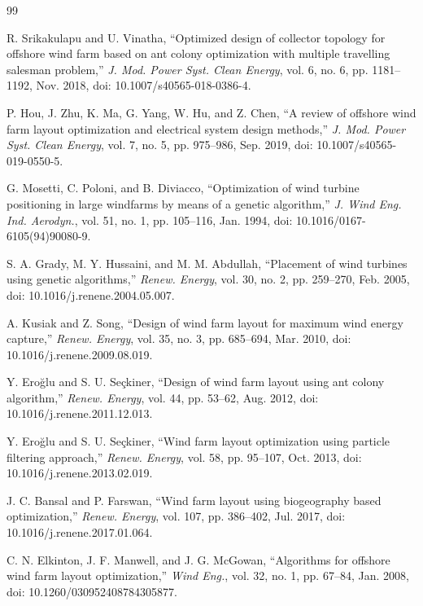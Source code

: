 \begin{thebibliography}{99}

R. Srikakulapu and U. Vinatha, ``Optimized design of collector topology for offshore wind farm based on ant colony optimization with multiple travelling salesman problem,'' \textit{J. Mod. Power Syst. Clean Energy}, vol. 6, no. 6, pp. 1181--1192, Nov. 2018, doi: 10.1007/s40565-018-0386-4.

P. Hou, J. Zhu, K. Ma, G. Yang, W. Hu, and Z. Chen, ``A review of offshore wind farm layout optimization and electrical system design methods,'' \textit{J. Mod. Power Syst. Clean Energy}, vol. 7, no. 5, pp. 975--986, Sep. 2019, doi: 10.1007/s40565-019-0550-5.

G. Mosetti, C. Poloni, and B. Diviacco, ``Optimization of wind turbine positioning in large windfarms by means of a genetic algorithm,'' \textit{J. Wind Eng. Ind. Aerodyn.}, vol. 51, no. 1, pp. 105--116, Jan. 1994, doi: 10.1016/0167-6105(94)90080-9.

S. A. Grady, M. Y. Hussaini, and M. M. Abdullah, ``Placement of wind turbines using genetic algorithms,'' \textit{Renew. Energy}, vol. 30, no. 2, pp. 259--270, Feb. 2005, doi: 10.1016/j.renene.2004.05.007.

A. Kusiak and Z. Song, ``Design of wind farm layout for maximum wind energy capture,'' \textit{Renew. Energy}, vol. 35, no. 3, pp. 685--694, Mar. 2010, doi: 10.1016/j.renene.2009.08.019.

Y. Ero\u{g}lu and S. U. Se\c{c}kiner, ``Design of wind farm layout using ant colony algorithm,'' \textit{Renew. Energy}, vol. 44, pp. 53--62, Aug. 2012, doi: 10.1016/j.renene.2011.12.013.

Y. Ero\u{g}lu and S. U. Se\c{c}kiner, ``Wind farm layout optimization using particle filtering approach,'' \textit{Renew. Energy}, vol. 58, pp. 95--107, Oct. 2013, doi: 10.1016/j.renene.2013.02.019.

J. C. Bansal and P. Farswan, ``Wind farm layout using biogeography based optimization,'' \textit{Renew. Energy}, vol. 107, pp. 386--402, Jul. 2017, doi: 10.1016/j.renene.2017.01.064.

C. N. Elkinton, J. F. Manwell, and J. G. McGowan, ``Algorithms for offshore wind farm layout optimization,'' \textit{Wind Eng.}, vol. 32, no. 1, pp. 67--84, Jan. 2008, doi: 10.1260/030952408784305877.


\end{thebibliography}
